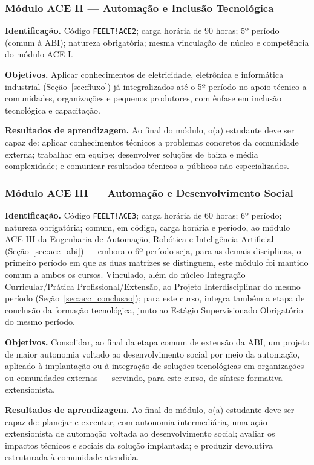 \subsubsection{Módulo ACE II --- Automação e Inclusão Tecnológica}
\label{sec:ace2}

\textbf{Identificação.} Código \texttt{FEELT!ACE2}; carga horária de 90 horas; 5º período (comum à ABI); natureza obrigatória; mesma vinculação de núcleo e competência do módulo ACE I.

\textbf{Objetivos.} Aplicar conhecimentos de eletricidade, eletrônica e informática industrial (Seção~\ref{sec:fluxo}) já integralizados até o 5º período no apoio técnico a comunidades, organizações e pequenos produtores, com ênfase em inclusão tecnológica e capacitação.

\textbf{Resultados de aprendizagem.} Ao final do módulo, o(a) estudante deve ser capaz de: aplicar conhecimentos técnicos a problemas concretos da comunidade externa; trabalhar em equipe; desenvolver soluções de baixa e média complexidade; e comunicar resultados técnicos a públicos não especializados.

\subsubsection{Módulo ACE III --- Automação e Desenvolvimento Social}
\label{sec:ace3}

\textbf{Identificação.} Código \texttt{FEELT!ACE3}; carga horária de 60 horas; 6º período; natureza obrigatória; comum, em código, carga horária e período, ao módulo ACE III da Engenharia de Automação, Robótica e Inteligência Artificial (Seção~\ref{sec:ace_abi}) — embora o 6º período seja, para as demais disciplinas, o primeiro período em que as duas matrizes se distinguem, este módulo foi mantido comum a ambos os cursos. Vinculado, além do núcleo Integração Curricular/Prática Profissional/Extensão, ao Projeto Interdisciplinar do mesmo período (Seção~\ref{sec:acc_conclusao}); para este curso, integra também a etapa de conclusão da formação tecnológica, junto ao Estágio Supervisionado Obrigatório do mesmo período.

\textbf{Objetivos.} Consolidar, ao final da etapa comum de extensão da ABI, um projeto de maior autonomia voltado ao desenvolvimento social por meio da automação, aplicado à implantação ou à integração de soluções tecnológicas em organizações ou comunidades externas — servindo, para este curso, de síntese formativa extensionista.

\textbf{Resultados de aprendizagem.} Ao final do módulo, o(a) estudante deve ser capaz de: planejar e executar, com autonomia intermediária, uma ação extensionista de automação voltada ao desenvolvimento social; avaliar os impactos técnicos e sociais da solução implantada; e produzir devolutiva estruturada à comunidade atendida.

